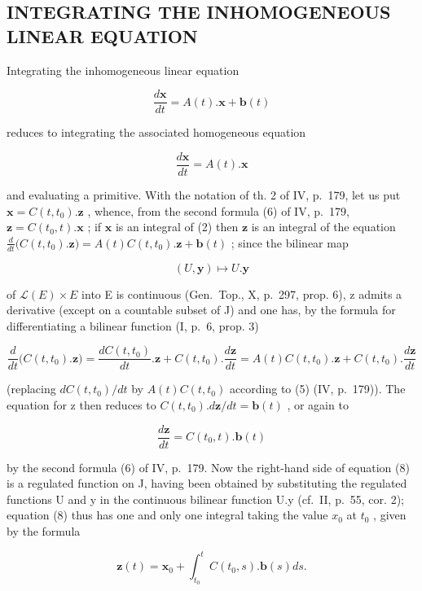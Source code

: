 \subsection{INTEGRATING THE INHOMOGENEOUS LINEAR EQUATION}

Integrating the inhomogeneous linear equation

\[
{\frac {d \mathbf {x}}{d t}} = A (t). \mathbf {x} + \mathbf {b} (t)\tag{2}
\]

reduces to integrating the associated homogeneous equation

\[
{\frac {d \mathbf {x}}{d t}} = A (t). \mathbf {x}\tag{4}
\]

and evaluating a primitive. With the notation of th. 2 of IV, p.~179, let us put \(\mathbf{x} = C(t, t_0).\mathbf{z}\) , whence, from the second formula (6) of IV, p.~179, \(\mathbf{z} = C(t_0, t).\mathbf{x}\) ; if \(\mathbf{x}\) is an integral of (2) then \(\mathbf{z}\) is an integral of the equation \(\frac{d}{dt}\big(C(t, t_0).\mathbf{z}\big) = A(t)C(t, t_0).\mathbf{z} + \mathbf{b}(t)\) ; since the bilinear map

\[
(U, \mathbf {y}) \mapsto U. \mathbf {y}
\]

of \(\mathcal{L}(E) \times E\) into E is continuous (Gen.~Top., X, p.~297, prop. 6), z admits a derivative (except on a countable subset of J) and one has, by the formula for differentiating a bilinear function (I, p.~6, prop. 3)

\[
\frac {d}{d t} \big (C (t, t _ {0}). \mathbf {z} \big) = \frac {d C (t , t _ {0})}{d t}. \mathbf {z} + C (t, t _ {0}). \frac {d \mathbf {z}}{d t} = A (t) C (t, t _ {0}). \mathbf {z} + C (t, t _ {0}). \frac {d \mathbf {z}}{d t}
\]

(replacing \(dC(t, t_{0})/dt\) by \(A(t)C(t, t_{0})\) according to (5) (IV, p.~179)). The equation for z then reduces to \(C(t, t_{0}).d\mathbf{z}/dt = \mathbf{b}(t)\) , or again to

\[
\frac {d \mathbf {z}}{d t} = C (t _ {0}, t). \mathbf {b} (t)\tag{8}
\]

by the second formula (6) of IV, p.~179. Now the right-hand side of equation (8) is a regulated function on J, having been obtained by substituting the regulated functions U and y in the continuous bilinear function U.y (cf.~II, p.~55, cor. 2); equation (8) thus has one and only one integral taking the value \(x_{0}\) at \(t_{0}\) , given by the formula

\[
\mathbf {z} (t) = \mathbf {x} _ {0} + \int_ {t _ {0}} ^ {t} C (t _ {0}, s). \mathbf {b} (s) d s.\tag{9}
\]

